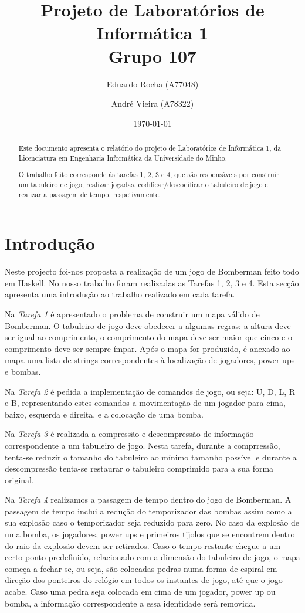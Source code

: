 \documentclass[a4paper]{article}
\title{Projeto de Laboratórios de Informática 1\\Grupo 107}
\author{Eduardo Rocha (A77048) \and André Vieira (A78322)}
\date{\today}
\begin{document}
\maketitle

\begin{abstract}
  Este documento apresenta o relatório do projeto de Laboratórios 
  de Informática 1, da Licenciatura em Engenharia Informática da 
  Universidade do Minho.

  O trabalho feito corresponde às tarefas 1, 2, 3 e 4, que são 
  responsáveis por construir um tabuleiro de jogo, realizar 
  jogadas, codificar/descodificar o tabuleiro de jogo e realizar
  a passagem de tempo, respetivamente.
\end{abstract}

\tableofcontents

\section{Introdução}
\label{sec:intro}
  
Neste projecto foi-nos proposta a realização de um jogo de Bomberman
feito todo em Haskell. No nosso trabalho foram realizadas as Tarefas 
1, 2, 3 e 4. Esta secção apresenta uma introdução ao trabalho realizado
em cada tarefa.

Na \emph{Tarefa 1} é apresentado o problema de construir um mapa válido 
de Bomberman. O tabuleiro de jogo deve obedecer a algumas regras: a
altura deve ser igual ao comprimento, o comprimento do mapa deve ser 
maior que cinco e o comprimento deve ser sempre ímpar. Após o mapa 
for produzido, é anexado ao mapa uma lista de strings correspondentes
à localização de jogadores, power ups e bombas.

Na \emph{Tarefa 2} é pedida a implementação de comandos de jogo, ou seja:
U, D, L, R e B, representando estes comandos a movimentação de um jogador
para cima, baixo, esquerda e direita, e a colocação de uma bomba. 

Na \emph{Tarefa 3} é realizada a compressão e descompressão de informação 
correspondente a um tabuleiro de jogo. Nesta tarefa, durante a comprressão,
tenta-se reduzir o tamanho do tabuleiro ao mínimo tamanho possível e 
durante a descompressão tenta-se restaurar o tabuleiro comprimido para a 
sua forma original.

Na \emph{Tarefa 4} realizamos a passagem de tempo dentro do jogo de Bomberman.
A passagem de tempo inclui a redução do temporizador das bombas assim como a 
sua explosão caso o temporizador seja reduzido para zero. No caso 
da explosão de uma bomba, os jogadores, power ups e primeiros tijolos que 
se encontrem dentro do raio da explosão devem ser retirados. Caso o 
tempo restante chegue a um certo ponto predefinido, relacionado com 
a dimensão do tabuleiro de jogo, o mapa começa a fechar-se, ou seja,
são colocadas pedras numa forma de espiral em direção dos ponteiros do
relógio em todos os instantes de jogo, até que o jogo acabe. Caso uma 
pedra seja colocada em cima de um jogador, power up ou bomba, a informação
correspondente a essa identidade será removida.
\end{document}
